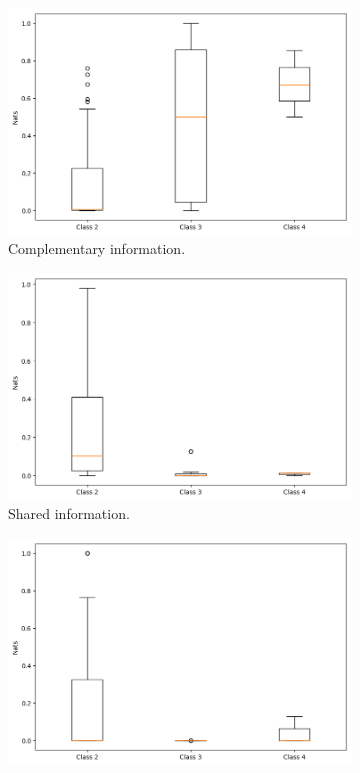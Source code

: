 \documentclass[12pt]{article}
\begin{document}
\begin{figure} [!h]
\begin{subfigure}{.5\textwidth}
  \centering
  \includegraphics[width=.9\linewidth]{eca-box-ci}
  \caption{Complementary information.}
  \label{fig:eca-box-ci}
\end{subfigure}%
\begin{subfigure}{.5\textwidth}
  \centering
  \includegraphics[width=.9\linewidth]{eca-box-si}
  \caption{Shared information.}
  \label{fig:eca-box-si}
\end{subfigure}
\begin{subfigure}{.5\textwidth}
  \centering
  \includegraphics[width=.9\linewidth]{eca-box-ui-y}

\end{subfigure}
\end{figure}
\end{document}
